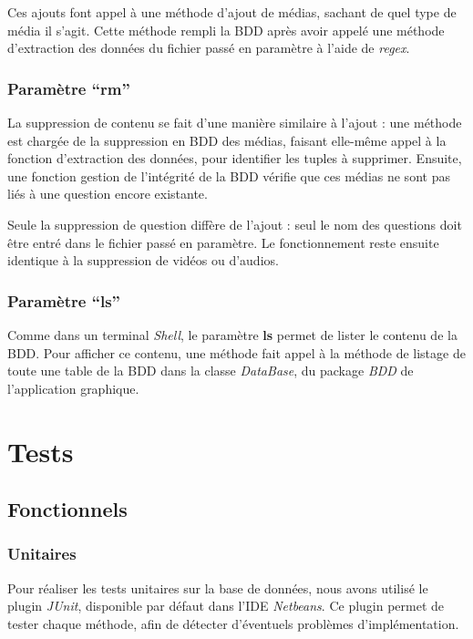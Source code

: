 Ces ajouts font appel à une méthode d'ajout de médias, sachant de quel type de média il s'agit. Cette méthode rempli la BDD après avoir appelé une méthode d'extraction des données du fichier passé en paramètre à l'aide de \textit{regex}.

\subsubsection{Paramètre ``rm''}

La suppression de contenu se fait d'une manière similaire à l'ajout : une méthode est chargée de la suppression en BDD des médias, faisant elle-même appel à la fonction d'extraction des données, pour identifier les tuples à supprimer. Ensuite, une fonction gestion de l'intégrité de la BDD vérifie que ces médias ne sont pas liés à une question encore existante.

Seule la suppression de question diffère de l'ajout : seul le nom des questions doit être entré dans le fichier passé en paramètre. Le fonctionnement reste ensuite identique à la suppression de vidéos ou d'audios.

\subsubsection{Paramètre ``ls''}

Comme dans un terminal \textit{Shell}, le paramètre \textbf{ls} permet de lister le contenu de la BDD. Pour afficher ce contenu, une méthode fait appel à la méthode de listage de toute une table de la BDD dans la classe \textit{DataBase}, du package \textit{BDD} de l'application graphique.

\section{Tests}\label{tests}

\subsection{Fonctionnels}

\subsubsection{Unitaires}

Pour réaliser les tests unitaires sur la base de données, nous avons utilisé le plugin \textit{JUnit}, disponible par défaut dans l'IDE \textit{Netbeans}.
Ce plugin permet de tester chaque méthode, afin de détecter d'éventuels problèmes d'implémentation.

